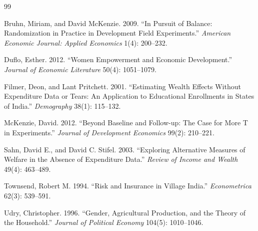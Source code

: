 \documentclass[12pt]{article}
\begin{document}
\newpage
\begin{thebibliography}{99}

Bruhn, Miriam, and David McKenzie. 2009. ``In Pursuit of Balance: Randomization in Practice in Development Field Experiments.'' \textit{American Economic Journal: Applied Economics} 1(4): 200--232.

Duflo, Esther. 2012. ``Women Empowerment and Economic Development.'' \textit{Journal of Economic Literature} 50(4): 1051--1079.

Filmer, Deon, and Lant Pritchett. 2001. ``Estimating Wealth Effects Without Expenditure Data or Tears: An Application to Educational Enrollments in States of India.'' \textit{Demography} 38(1): 115--132.

McKenzie, David. 2012. ``Beyond Baseline and Follow-up: The Case for More T in Experiments.'' \textit{Journal of Development Economics} 99(2): 210--221.

Sahn, David E., and David C. Stifel. 2003. ``Exploring Alternative Measures of Welfare in the Absence of Expenditure Data.'' \textit{Review of Income and Wealth} 49(4): 463--489.

Townsend, Robert M. 1994. ``Risk and Insurance in Village India.'' \textit{Econometrica} 62(3): 539--591.

Udry, Christopher. 1996. ``Gender, Agricultural Production, and the Theory of the Household.'' \textit{Journal of Political Economy} 104(5): 1010--1046.

\end{thebibliography}
\end{document}
